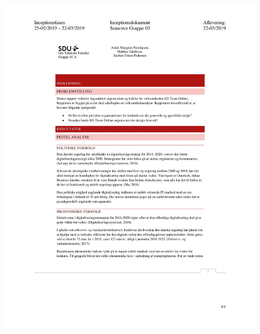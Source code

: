 \begin{figure}[hb]
  \includegraphics[scale = 0.33]{./PNG/Inceptions/Gruppe02+InceptionsDokument-48.jpg} 
\end{figure}

